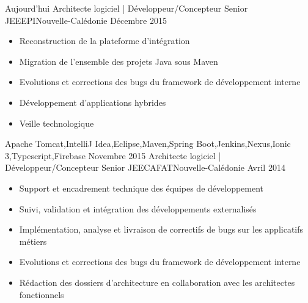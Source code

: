 %
%
%

\begin{experiences}
  \experience
    {Aujourd'hui}   {Architecte logiciel | Développeur/Concepteur Senior JEE}{EPI}{Nouvelle-Calédonie}
    {Décembre 2015} {
                      \begin{itemize}
                        \item Reconstruction de la plateforme d'intégration                        
                        \item Migration de l'ensemble des projets Java sous Maven                    
                        \item Evolutions et corrections des bugs du framework de développement interne  
                        \item Développement d'applications hybrides              
                        \item Veille technologique                                                                    
                      \end{itemize}
                    }
                    {Apache Tomcat,IntelliJ Idea,Eclipse,Maven,Spring Boot,Jenkins,Nexus,Ionic 3,Typescript,Firebase}
  \emptySeparator
  \experience
    {Novembre 2015} {Architecte logiciel | Développeur/Concepteur Senior JEE}{CAFAT}{Nouvelle-Calédonie}
    {Avril 2014}    {
                      \begin{itemize}
                        \item Support et encadrement technique des équipes de développement                           
                        \item Suivi, validation et intégration des développements externalisés                        
                        \item Implémentation, analyse et livraison de correctifs de bugs sur les applicatifs métiers  
                        \item Evolutions et corrections des bugs du framework de développement interne                
                        \item Rédaction des dossiers d'architecture en collaboration avec les architectes fonctionnels

\end{itemize}}
\end{experiences}
